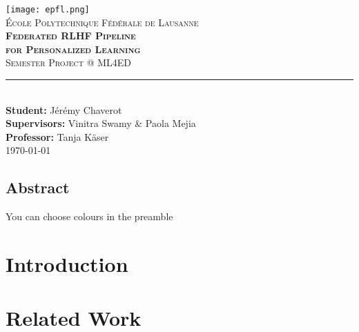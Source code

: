 \documentclass[11pt,titlepage]{report}
\begin{document}
\begin{titlepage}
	\centering
    \texttt{[image: epfl.png]}\\[0.25cm] 	%
    \textsc{\LARGE École Polytechnique Fédérale de Lausanne}\\ \vspace{\fill}
    \textbf{\textsc{\fontsize{30}{30}\selectfont Federated RLHF Pipeline \\ \vspace{0.3cm}for Personalized Learning}}\\ \vspace{\fill}		
	\textsc{\LARGE Semester Project @ ML4ED}\\[0.4cm]
	\rule{\linewidth}{0.2 mm} \\[0.5 cm]
	\textbf{Student:} Jérémy Chaverot \\
	\textbf{Supervisors:} Vinitra Swamy \& Paola Mejia \\
	\textbf{Professor:} Tanja Käser \\ [2cm] \today
\end{titlepage}
\restoregeometry

\thispagestyle{numberonly}
\begin{summary}
\section*{Abstract}

You can choose colours in the preamble

\lipsum[1]
\end{summary}




\chapter{Introduction}


\chapter{Related Work}

\end{document}
